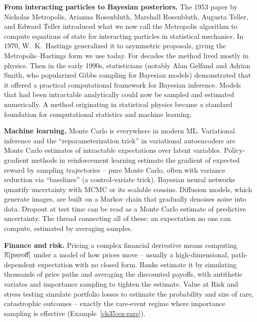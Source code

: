 \begin{connectionbox}
\textbf{From interacting particles to Bayesian posteriors.}
The 1953 paper by Nicholas Metropolis, Arianna Rosenbluth, Marshall Rosenbluth,
Augusta Teller, and Edward Teller introduced what we now call the Metropolis algorithm
to compute equations of state for interacting particles in statistical mechanics.
In 1970, W.\ K.\ Hastings generalized it to asymmetric proposals, giving the
Metropolis--Hastings form we use today. For decades the method lived mostly in physics.
Then in the early 1990s, statisticians (notably Alan Gelfand and Adrian Smith, who
popularized Gibbs sampling for Bayesian models) demonstrated that it offered a practical
computational framework for Bayesian inference. Models that had been intractable
analytically could now be sampled and estimated numerically. A method originating in
statistical physics became a standard foundation for computational statistics and machine learning.
\end{connectionbox}

\begin{applicationbox}
\textbf{Machine learning.} Monte Carlo is everywhere in modern ML. Variational
inference and the ``reparameterization trick'' in variational autoencoders are
Monte Carlo estimates of intractable expectations over latent variables.
Policy-gradient methods in reinforcement learning estimate the gradient of
expected reward by sampling trajectories -- pure Monte Carlo, often with variance
reduction via ``baselines'' (a control-variate trick). Bayesian neural networks
quantify uncertainty with MCMC or its scalable cousins. Diffusion models, which
generate images, are built on a Markov chain that gradually denoises noise into
data. Dropout at test time can be read as a Monte Carlo estimate of predictive
uncertainty. The thread connecting all of these: an expectation no one can
compute, estimated by averaging samples.
\end{applicationbox}

\begin{applicationbox}
\textbf{Finance and risk.} Pricing a complex financial derivative means computing
$\operatorname{\mathbb{E}}[\text{payoff}]$ under a model of how prices move -- usually a
high-dimensional, path-dependent expectation with no closed form. Banks estimate
it by simulating thousands of price paths and averaging the discounted payoffs,
with antithetic variates and importance sampling to tighten the estimate. Value
at Risk and stress testing simulate portfolio losses to estimate the probability
and size of rare, catastrophic outcomes -- exactly the rare-event regime where
importance sampling is effective (Example~\ref{ch35:ex-rare}).
\end{applicationbox}

